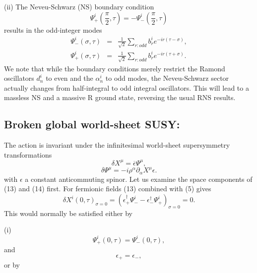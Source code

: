 \documentclass[a4paper,a4paper]{article}
\begin{document}
(ii) The Neveu-Schwarz (NS) boundary condition
\begin{equation}
\Psi_{+}^{i}(\frac{\pi}{2},\tau)=-\Psi_{-}^{i}(\frac{\pi}{2},\tau)
\end{equation}
results in the odd-integer modes
\begin{eqnarray}
\Psi_{-}^{i}(\sigma,\tau)&=&\frac{1}{\sqrt{2}}\sum_{r:odd}b_{r}^{i}e^{-ir(\tau-\sigma)},\\
\Psi_{+}^{i}(\sigma,\tau)&=&\frac{1}{\sqrt{2}}\sum_{r:odd}b_{r}^{i}e^{-ir(\tau+\sigma)}.
\end{eqnarray}
We note that while the boundary conditions merely restrict the
Ramond oscillators $d^{i}_{n}$ to even and the $\alpha_{n}^{i}$ to
odd modes, the Neveu-Schwarz sector actually changes from
half-integral to odd integral oscillators.  This will lead to a
massless NS and a massive R ground state, reversing the usual RNS
results.

\subsection{Broken global world-sheet SUSY:}
The action is invariant under the infinitesimal world-sheet
supersymmetry transformations
\begin{equation}
\delta X^{\mu}=\overline{\epsilon}\Psi^{\mu},
\end{equation}
\begin{equation}
\delta\Psi^{\mu}=-i\rho^{\alpha}\partial_{\alpha}X^{\mu}\epsilon.
\end{equation}
with $\epsilon$ a constant anticommuting spinor. Let us examine
the space components of (13) and (14) first. For fermionic fields
(13) combined with (5) gives
\begin{equation}
\delta X^{i}(0,\tau)_{\sigma = 0} =
(\epsilon_{+}^{\dag}\Psi_{-}^{i}-\epsilon_{-}^{\dag}
\Psi_{+}^{i})_{\sigma=0}=0.
\end{equation}
This would normally be satisfied either by

(i)
\begin{equation}
\Psi_{+}^{i}(0,\tau)=\Psi_{-}^{i}(0,\tau),
\end{equation}
and
\begin{equation}
\epsilon_{+}=\epsilon_{-},
\end{equation}
or by
\end{document}
